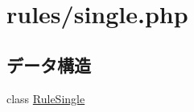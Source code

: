 \hypertarget{single_8php}{
\section{rules/single.php}
\label{single_8php}
}
\subsection*{データ構造}
\begin{DoxyCompactItemize}
\item 
class \hyperlink{class_rule_single}{\-Rule\-Single}
\end{DoxyCompactItemize}
